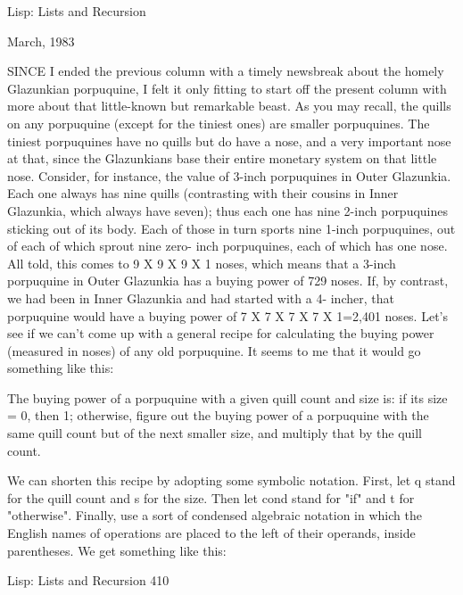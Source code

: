 

                      Lisp: Lists and Recursion

                                     March, 1983




SINCE I ended the previous column with a timely newsbreak about the homely
Glazunkian porpuquine, I felt it only fitting to start off the present column with more
about that little-known but remarkable beast. As you may recall, the quills on any
porpuquine (except for the tiniest ones) are smaller porpuquines. The tiniest
porpuquines have no quills but do have a nose, and a very important nose at that,
since the Glazunkians base their entire monetary system on that little nose. Consider,
for instance, the value of 3-inch porpuquines in Outer Glazunkia. Each one always
has nine quills (contrasting with their cousins in Inner Glazunkia, which always have
seven); thus each one has nine 2-inch porpuquines sticking out of its body. Each of
those in turn sports nine 1-inch porpuquines, out of each of which sprout nine zero-
inch porpuquines, each of which has one nose. All told, this comes to 9 X 9 X 9 X 1
noses, which means that a 3-inch porpuquine in Outer Glazunkia has a buying power
of 729 noses. If, by contrast, we had been in Inner Glazunkia and had started with a 4-
incher, that porpuquine would have a buying power of 7 X 7 X 7 X 7 X 1=2,401
noses.
        Let's see if we can't come up with a general recipe for calculating the buying
power (measured in noses) of any old porpuquine. It seems to me that it would go
something like this:

The buying power of a porpuquine with a given quill count and size is:
      if its size = 0, then 1;
      otherwise, figure out the buying power of a porpuquine with
                       the same quill count but of the next smaller size,
               and multiply that by the quill count.

We can shorten this recipe by adopting some symbolic notation. First, let q stand for
the quill count and s for the size. Then let cond stand for "if" and t for "otherwise".
Finally, use a sort of condensed algebraic notation in which the English names of
operations are placed to the left of their operands, inside parentheses. We get
something like this:




Lisp: Lists and Recursion                                                          410

